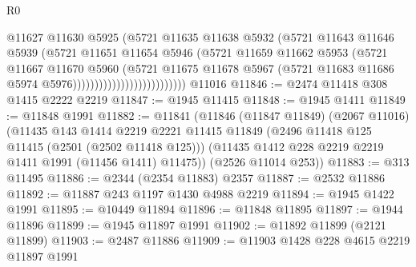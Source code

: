 \begin{lexlean}{R0}
\begin{coremodule}
                                          @11627
                                          @11630
                                          @5925
                                          (@5721
                                            @11635
                                            @11638
                                            @5932
                                            (@5721
                                              @11643
                                              @11646
                                              @5939
                                              (@5721
                                                @11651
                                                @11654
                                                @5946
                                                (@5721
                                                  @11659
                                                  @11662
                                                  @5953
                                                  (@5721
                                                    @11667
                                                    @11670
                                                    @5960
                                                    (@5721
                                                      @11675
                                                      @11678
                                                      @5967
                                                      (@5721
                                                        @11683
                                                        @11686
                                                        @5974
                                                        @5976))))))))))))))))))))))))))
    @11016
@11846 := @2474 @11418 @308 @1415 @2222 @2219
@11847 := @1945 @11415
@11848 := @1945 @1411
@11849 := @11848 @1991
@11882 := @11841
    (@11846
      (@11847 @11849)
      (@2067 @11016)
      (@11435
        @143
        @1414
        @2219
        @2221
        @11415
        @11849
        (@2496 @11418 @125 @11415 (@2501 (@2502 @11418 @125)))
        (@11435 @1412 @228 @2219 @2219 @1411 @1991 (@11456 @1411) @11475))
      (@2526 @11014 @253))
@11883 := @313 @11495
@11886 := @2344 (@2354 @11883) @2357
@11887 := @2532 @11886
@11892 := @11887 @243 @1197 @1430 @4988 @2219
@11894 := @1945 @1422 @1991
@11895 := @10449 @11894
@11896 := @11848 @11895
@11897 := @1944 @11896
@11899 := @1945 @11897 @1991
@11902 := @11892 @11899 (@2121 @11899)
@11903 := @2487 @11886
@11909 := @11903 @1428 @228 @4615 @2219 @11897 @1991

\end{coremodule}
\end{lexlean}
